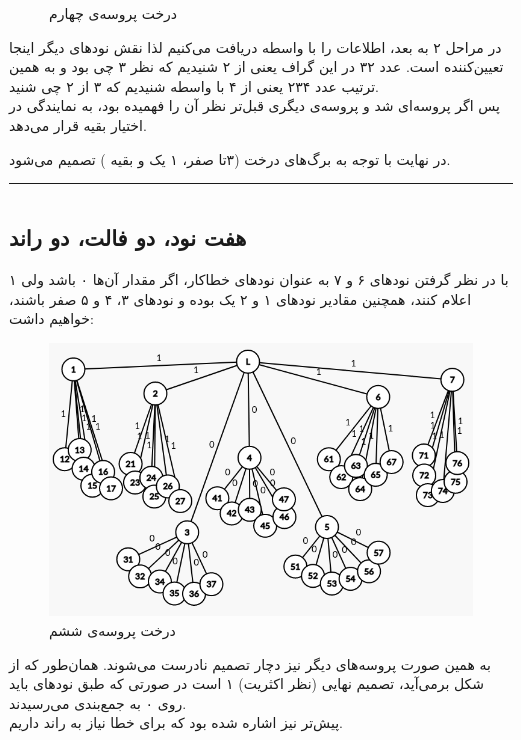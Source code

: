 \documentclass{article}
\begin{document}
\begin{multicols}{2}
\begin{figure}[H]
    \caption{
    درخت پروسه‌ی چهارم
    }
    \label{fig:my_label}
\end{figure}
در مراحل ۲ به بعد، اطلاعات را با واسطه دریافت می‌کنیم لذا نقش نودهای دیگر اینجا تعیین‌کننده است. عدد ۳۲ در این گراف یعنی از ۲ شنیدیم که نظر ۳ چی بود و به همین ترتیب عدد ۲۳۴ یعنی از ۴ با واسطه شنیدیم که ۳ از ۲ چی شنید. \\
پس اگر پروسه‌ای
شد و پروسه‌ی دیگری قبل‌تر نظر آن را فهمیده بود، به نمایندگی در اختیار بقیه قرار می‌دهد.

در نهایت با توجه به برگ‌های درخت (۳تا صفر، ۱ یک و بقیه
)
تصمیم
می‌شود. \\
\rule{\linewidth}{1pt}
\section{}
\subsection{هفت نود، دو فالت، دو راند}
با در نظر گرفتن نودهای ۶ و ۷ به عنوان نودهای خطاکار، اگر مقدار آن‌ها ۰ باشد ولی ۱ اعلام کنند، همچنین مقادیر نودهای ۱ و ۲ یک بوده و نودهای ۳، ۴ و ۵ صفر باشند، خواهیم داشت:
\begin{figure}[H]
    \centering
    \includegraphics[width=0.99\linewidth]{Photos/HW5/p6.png}
    \caption{
    درخت پروسه‌ی ششم
    }
    \label{fig:my_label}
\end{figure}
به همین صورت پروسه‌های دیگر نیز دچار تصمیم نادرست می‌شوند.
همان‌طور که از شکل برمی‌آید، تصمیم نهایی (نظر اکثریت) ۱ است در صورتی که طبق
نودهای
باید روی ۰ به جمع‌بندی می‌رسیدند.\\
پیش‌تر نیز اشاره شده بود که برای 
خطا نیاز به 
راند داریم.

\end{multicols}
\end{document}
